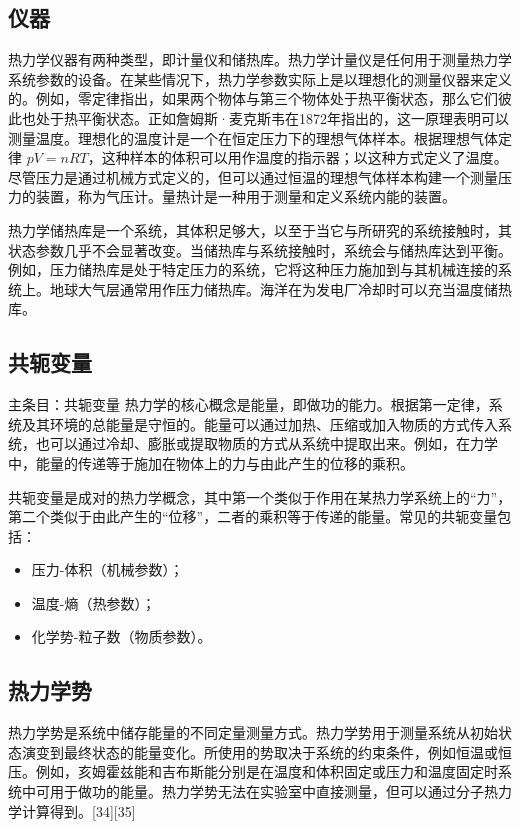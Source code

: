 \subsection{仪器} 
热力学仪器有两种类型，即计量仪和储热库。热力学计量仪是任何用于测量热力学系统参数的设备。在某些情况下，热力学参数实际上是以理想化的测量仪器来定义的。例如，零定律指出，如果两个物体与第三个物体处于热平衡状态，那么它们彼此也处于热平衡状态。正如詹姆斯·麦克斯韦在1872年指出的，这一原理表明可以测量温度。理想化的温度计是一个在恒定压力下的理想气体样本。根据理想气体定律 \( pV = nRT \)，这种样本的体积可以用作温度的指示器；以这种方式定义了温度。尽管压力是通过机械方式定义的，但可以通过恒温的理想气体样本构建一个测量压力的装置，称为气压计。量热计是一种用于测量和定义系统内能的装置。

热力学储热库是一个系统，其体积足够大，以至于当它与所研究的系统接触时，其状态参数几乎不会显著改变。当储热库与系统接触时，系统会与储热库达到平衡。例如，压力储热库是处于特定压力的系统，它将这种压力施加到与其机械连接的系统上。地球大气层通常用作压力储热库。海洋在为发电厂冷却时可以充当温度储热库。
\subsection{共轭变量}  
主条目：共轭变量  
热力学的核心概念是能量，即做功的能力。根据第一定律，系统及其环境的总能量是守恒的。能量可以通过加热、压缩或加入物质的方式传入系统，也可以通过冷却、膨胀或提取物质的方式从系统中提取出来。例如，在力学中，能量的传递等于施加在物体上的力与由此产生的位移的乘积。

共轭变量是成对的热力学概念，其中第一个类似于作用在某热力学系统上的“力”，第二个类似于由此产生的“位移”，二者的乘积等于传递的能量。常见的共轭变量包括：
\begin{itemize}
\item 压力-体积（机械参数）；
\item 温度-熵（热参数）；
\item 化学势-粒子数（物质参数）。
\end{itemize}
\subsection{热力学势}  
热力学势是系统中储存能量的不同定量测量方式。热力学势用于测量系统从初始状态演变到最终状态的能量变化。所使用的势取决于系统的约束条件，例如恒温或恒压。例如，亥姆霍兹能和吉布斯能分别是在温度和体积固定或压力和温度固定时系统中可用于做功的能量。热力学势无法在实验室中直接测量，但可以通过分子热力学计算得到。[34][35]